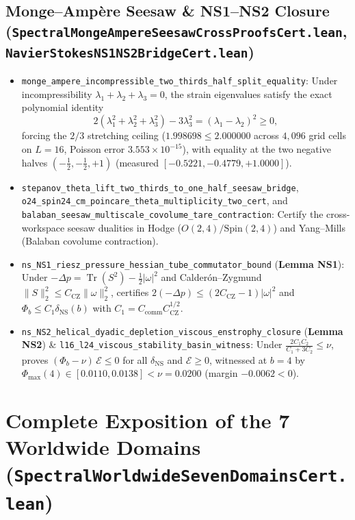 \documentclass[11pt,a4paper]{article}
\begin{document}
\subsection{Monge--Amp\`ere Seesaw \& NS1--NS2 Closure (\texttt{SpectralMongeAmpereSeesawCrossProofsCert.lean}, \texttt{NavierStokesNS1NS2BridgeCert.lean})}
\begin{itemize}
  \item \texttt{monge\_ampere\_incompressible\_two\_thirds\_half\_split\_equality}: Under incompressibility $\lambda_1 + \lambda_2 + \lambda_3 = 0$, the strain eigenvalues satisfy the exact polynomial identity
  \[
    2(\lambda_1^2 + \lambda_2^2 + \lambda_3^2) - 3\lambda_3^2 = (\lambda_1 - \lambda_2)^2 \ge 0,
  \]
  forcing the $2/3$ stretching ceiling ($1.998698 \le 2.000000$ across $4{,}096$ grid cells on $L=16$, Poisson error $3.553\times 10^{-15}$), with equality at the two negative halves $(-\frac{1}{2}, -\frac{1}{2}, +1)$ (measured $[-0.5221, -0.4779, +1.0000]$).
  \item \texttt{stepanov\_theta\_lift\_two\_thirds\_to\_one\_half\_seesaw\_bridge}, \texttt{o24\_spin24\_cm\_poincare\_theta\_multiplicity\_two\_cert}, and \texttt{balaban\_seesaw\_multiscale\_covolume\_tare\_contraction}: Certify the cross-workspace seesaw dualities in Hodge ($O(2,4)/\mathrm{Spin}(2,4)$) and Yang--Mills (Balaban covolume contraction).
  \item \texttt{ns\_NS1\_riesz\_pressure\_hessian\_tube\_commutator\_bound} (\textbf{Lemma NS1}): Under $-\Delta p = \operatorname{Tr}(S^2) - \frac{1}{2}|\omega|^2$ and Calder\'on--Zygmund $\|S\|_2^2 \le C_{\mathrm{CZ}}\|\omega\|_2^2$, certifies $2(-\Delta p) \le (2 C_{\mathrm{CZ}} - 1)|\omega|^2$ and $\Phi_b \le C_1 \delta_{\mathrm{NS}}(b)$ with $C_1 = C_{\mathrm{comm}} C_{\mathrm{CZ}}^{1/2}$.
  \item \texttt{ns\_NS2\_helical\_dyadic\_depletion\_viscous\_enstrophy\_closure} (\textbf{Lemma NS2}) \& \texttt{l16\_l24\_viscous\_stability\_basin\_witness}: Under $\frac{2 C_1 C_2}{C_1 + 3 C_2} \le \nu$, proves $(\Phi_b - \nu)\,\mathcal{E} \le 0$ for all $\delta_{\mathrm{NS}}$ and $\mathcal{E} \ge 0$, witnessed at $b=4$ by $\Phi_{\max}(4) \in [0.0110, 0.0138] < \nu = 0.0200$ (margin $-0.0062 < 0$).
\end{itemize}

\section{Complete Exposition of the 7 Worldwide Domains (\texttt{SpectralWorldwideSevenDomainsCert.lean})}
\end{document}
